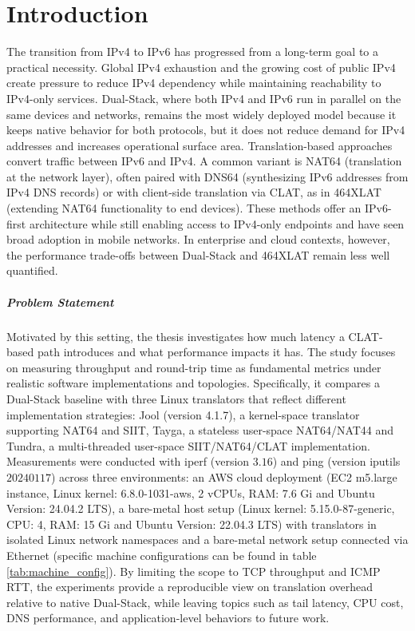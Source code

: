 \chapter{Introduction}
The transition from IPv4 to IPv6 has progressed from a long-term goal to a practical necessity. Global IPv4 exhaustion and the growing cost of public IPv4 create pressure to reduce IPv4 dependency while maintaining reachability to IPv4-only services\cite{7737362,LEVIN20141059}. 
Dual-Stack, where both IPv4 and IPv6 run in parallel on the same devices and networks, remains the most widely deployed model because it keeps native behavior for both protocols, but it does not reduce demand for IPv4 addresses and increases operational surface area\cite{rfc4213}. 
Translation-based approaches convert traffic between IPv6 and IPv4. A common variant is NAT64 (translation at the network layer), often paired with DNS64 (synthesizing IPv6 addresses from IPv4 DNS records) or with client-side translation via CLAT, as in 464XLAT (extending NAT64 functionality to end devices). These methods offer an IPv6-first architecture while still enabling access to IPv4-only endpoints and have seen broad adoption in mobile networks\cite{rfc6146,rfc6147,rfc6877}. In enterprise and cloud contexts, however, the performance trade-offs between Dual-Stack and 464XLAT remain less well quantified.


\paragraph{Problem Statement}

Motivated by this setting, 
the thesis investigates how much latency a CLAT-based path introduces and what performance impacts it has. The study focuses on measuring throughput and round-trip time as fundamental metrics under realistic software implementations and topologies. Specifically, it compares a Dual-Stack baseline
with three Linux translators that reflect different implementation strategies: Jool (version 4.1.7), a kernel-space translator supporting NAT64 and SIIT\cite{jool_introduction}, Tayga, a stateless user-space NAT64/NAT44\cite{palrd_tayga_readme,Repas_Farnadi_Lencse_2014} and Tundra, a multi-threaded user-space SIIT/NAT64/CLAT implementation\cite{labuda_tundra_nat64}. Measurements were conducted with
iperf (version $3.16$) and ping (version iputils $20240117$) across three environments: 
an AWS cloud deployment (EC2 m5.large instance, Linux kernel: 6.8.0-1031-aws, 2 vCPUs, RAM: 7.6 Gi and Ubuntu Version: 24.04.2 LTS), a bare-metal host setup (Linux kernel: 5.15.0-87-generic, CPU: 4, RAM: 15 Gi and Ubuntu Version: 22.04.3 LTS) with translators in isolated Linux network namespaces and a bare-metal network setup connected via Ethernet  (specific machine configurations can be found in table \ref{tab:machine_config}). By limiting the scope to TCP throughput and ICMP RTT, the experiments provide a reproducible view on translation overhead relative to native Dual-Stack, while leaving topics such as tail latency, CPU cost, DNS performance, and application-level behaviors to future work.


